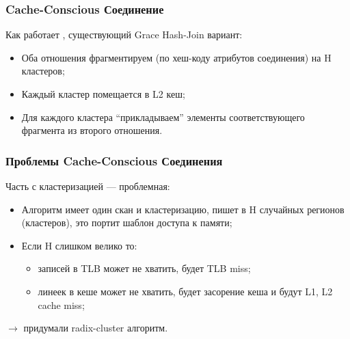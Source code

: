 \documentclass{beamer}
\begin{document}
\begin{frame}
\frametitle{Cache-Conscious Соединение}

Как работает \cite{Shatdal1994}, существующий Grace Hash-Join вариант: 

\begin{itemize}
  \setlength\itemsep{1em}
  \item Оба отношения фрагментируем (по хеш-коду атрибутов соединения) на H кластеров;
  \item Каждый кластер помещается в L2 кеш;
  \item Для каждого кластера ``прикладываем'' элементы соответствующего фрагмента из второго отношения.
\end{itemize}

\end{frame}


\begin{frame}
\frametitle{Проблемы Cache-Conscious Соединения}

Часть с кластеризацией --- проблемная:
\begin{itemize}
  \setlength\itemsep{1em}
  \item Алгоритм имеет один скан и кластеризацию, пишет в H случайных регионов (кластеров), это портит шаблон доступа к памяти;
  \item Если H слишком велико то:
  \begin{itemize}
  	\item записей в TLB может не хватить, будет TLB miss;
  	\item линеек в кеше может не хватить, будет засорение кеша и будут L1, L2 cache miss;  	
  \end{itemize}
  
\end{itemize}

$\longrightarrow$ придумали radix-cluster алгоритм.

\end{frame}
\end{document}
